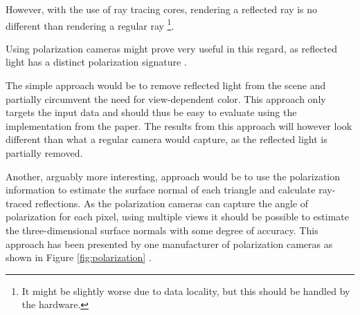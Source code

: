 However, with the use of ray tracing cores, rendering a reflected ray is no different than rendering a regular ray \footnote{It might be slightly worse due to data locality, but this should be handled by the hardware.}.


Using polarization cameras might prove very useful in this regard, as reflected light has a distinct polarization signature \cite{lingUniversityPhysicsVolume2016}.




The simple approach would be to remove reflected light from the scene and partially circumvent the need for view-dependent color.
This approach only targets the input data and should thus be easy to evaluate using the implementation from the paper.
The results from this approach will however look different than what a regular camera would capture, as the reflected light is partially removed.

Another, arguably more interesting, approach would be to use the polarization information to estimate the surface normal of each triangle and calculate ray-traced reflections.
As the polarization cameras can capture the angle of polarization for each pixel, using multiple views it should be possible to estimate the three-dimensional surface normals with some degree of accuracy.
This approach has been presented by one manufacturer of polarization cameras as shown in Figure \ref{fig:polarization} \cite{lucidvisionlabs3DDepthSurface2021}.





